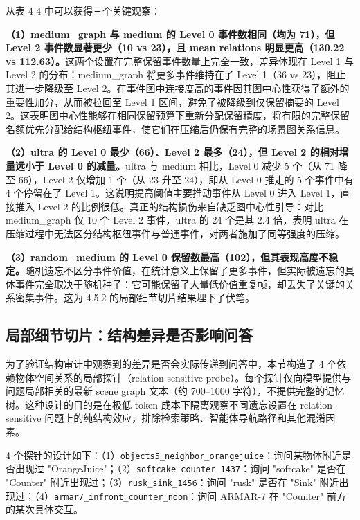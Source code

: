 从表 4-4 中可以获得三个关键观察：

\textbf{（1）medium\_graph 与 medium 的 Level 0 事件数相同（均为 71），但 Level 2 事件数显著更少（10 vs 23），且 mean relations 明显更高（130.22 vs 112.63）。}这两个设置在完整保留事件数量上完全一致，差异体现在 Level 1 与 Level 2 的分布：medium\_graph 将更多事件维持在了 Level 1（36 vs 23），阻止其进一步降级至 Level 2。在事件图中连接度高的事件因其图中心性获得了额外的重要性加分，从而被拉回至 Level 1 区间，避免了被降级到仅保留摘要的 Level 2。这表明图中心性能够在相同保留预算下重新分配保留精度，将有限的完整保留名额优先分配给结构枢纽事件，使它们在压缩后仍保有完整的场景图关系信息。

\textbf{（2）ultra 的 Level 0 最少（66）、Level 2 最多（24），但 Level 2 的相对增量远小于 Level 0 的减量。}ultra 与 medium 相比，Level 0 减少 5 个（从 71 降至 66），Level 2 仅增加 1 个（从 23 升至 24），即从 Level 0 推走的 5 个事件中有 4 个停留在了 Level 1。这说明提高阈值主要推动事件从 Level 0 进入 Level 1，直接推入 Level 2 的比例很低。真正的结构损伤来自缺乏图中心性引导：对比 medium\_graph 仅 10 个 Level 2 事件，ultra 的 24 个是其 2.4 倍，表明 ultra 在压缩过程中无法区分结构枢纽事件与普通事件，对两者施加了同等强度的压缩。

\textbf{（3）random\_medium 的 Level 0 保留数最高（102），但其表现高度不稳定。}随机遗忘不区分事件价值，在统计意义上保留了更多事件，但实际被遗忘的具体事件完全取决于随机种子：它可能保留了大量低价值重复帧，却丢失了关键的关系密集事件。这为 4.5.2 的局部细节切片结果埋下了伏笔。

\subsection{局部细节切片：结构差异是否影响问答}

为了验证结构审计中观察到的差异是否会实际传递到问答中，本节构造了 4 个依赖物体空间关系的局部探针（relation-sensitive probe）。每个探针仅向模型提供与问题局部相关的最新 scene graph 文本（约 700–1000 字符），不提供完整的记忆树。这种设计的目的是在极低 token 成本下隔离观察不同遗忘设置在 relation-sensitive 问题上的纯结构效应，排除检索策略、智能体导航路径和其他混淆因素。

4 个探针的设计如下：（1）\texttt{objects5\_neighbor\_orangejuice}：询问某物体附近是否出现过 "OrangeJuice"；（2）\texttt{softcake\_counter\_1437}：询问 "softcake" 是否在 "Counter" 附近出现过；（3）\texttt{rusk\_sink\_1456}：询问 "rusk" 是否在 "Sink" 附近出现过；（4）\texttt{armar7\_infront\_counter\_noon}：询问 ARMAR-7 在 "Counter" 前方的某次具体交互。

